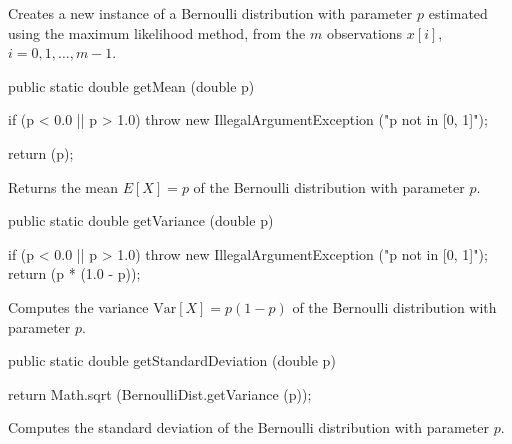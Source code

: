 \begin{tabb}
   Creates a new instance of a Bernoulli distribution with parameter
   ${p}$ estimated using the maximum likelihood method, from
   the $m$ observations $x[i]$,  $i = 0, 1, \ldots, m-1$.
\end{tabb}
\begin{htmlonly}
\end{htmlonly}
\begin{code}

   public static double getMean (double p)\begin{hide} {
      if (p < 0.0 || p > 1.0)
         throw new IllegalArgumentException ("p not in [0, 1]");

      return (p);
   }\end{hide}
\end{code}
\begin{tabb} Returns the mean $E[X] = p$ of the Bernoulli distribution with
   parameter $p$.
\end{tabb}
\begin{htmlonly}
\end{htmlonly}
\begin{code}

   public static double getVariance (double p)\begin{hide} {
      if (p < 0.0 || p > 1.0)
         throw new IllegalArgumentException ("p not in [0, 1]");
      return (p * (1.0 - p));
   }\end{hide}
\end{code}
\begin{tabb}  Computes the variance $\mbox{Var}[X] = p(1 - p)$ of the Bernoulli
   distribution with parameter $p$.
\end{tabb}
\begin{htmlonly}
\end{htmlonly}
\begin{code}

   public static double getStandardDeviation (double p)\begin{hide} {
      return Math.sqrt (BernoulliDist.getVariance (p));
   }\end{hide}
\end{code}
\begin{tabb}  Computes the standard deviation of the Bernoulli distribution
   with parameter $p$.
\end{tabb}
